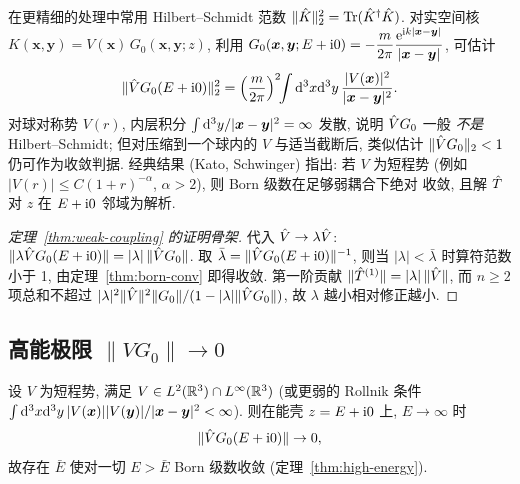 \begin{remark}
在更精细的处理中常用 Hilbert--Schmidt 范数
$\|\hat{K}\|_{2}^{2}=\operatorname{Tr}(\hat{K}^{\dagger}\hat{K})$. 对实空间核
$K(\bm x,\bm y)=V(\bm x)\,G_{0}(\bm x,\bm y;z)$, 利用
$G_{0}(\bm x,\bm y;E+\mathrm{i} 0)=-\dfrac{m}{2\pi}\dfrac{\mathrm{e}^{\mathrm{i} k|\bm x-\bm y|}}{|\bm x-\bm y|}$,
可估计
\begin{equation}
\|\hat{V} G_{0}(E+\mathrm{i} 0)\|_{2}^{2}
=\Bigl(\frac{m}{2\pi}\Bigr)^{2}\!\!\int\mathrm{d}^{3}x\mathrm{d}^{3}y\,
\frac{|V(\bm x)|^{2}}{|\bm x-\bm y|^{2}}.
\label{eq:born-HS}
\end{equation}
对球对称势 $V(r)$, 内层积分 $\int\mathrm{d}^{3}y/|\bm x-\bm y|^{2}=\infty$ 发散,
说明 $\hat{V} G_{0}$ 一般 \emph{不是} Hilbert--Schmidt; 但对压缩到一个球内的
$V$ 与适当截断后, 类似估计 $\|\hat{V} G_{0}\|_{2}<1$ 仍可作为收敛判据.
经典结果 (Kato, Schwinger) 指出: 若 $V$ 为短程势 (例如
$|V(r)|\le C(1+r)^{-\alpha}$, $\alpha>2$), 则 Born 级数在足够弱耦合下绝对
收敛, 且解 $\hat{T}$ 对 $z$ 在 $E+\mathrm{i} 0$ 邻域为解析.
\end{remark}

\begin{proof}[定理~\ref{thm:weak-coupling} 的证明骨架]
代入 $\hat{V}\to\lambda\hat{V}$:
$\|\lambda\hat{V} G_{0}(E+\mathrm{i} 0)\|=|\lambda|\,\|\hat{V} G_{0}\|$. 取
$\bar\lambda=\|\hat{V} G_{0}(E+\mathrm{i} 0)\|^{-1}$, 则当 $|\lambda|<\bar\lambda$
时算符范数小于 1, 由定理~\ref{thm:born-conv} 即得收敛. 第一阶贡献
$\|\hat{T}^{(1)}\|=|\lambda|\,\|\hat{V}\|$, 而 $n\ge 2$ 项总和不超过
$|\lambda|^{2}\|\hat{V}\|^{2}\|G_{0}\|/(1-|\lambda|\|\hat{V} G_{0}\|)$, 故
$\lambda$ 越小相对修正越小.
\end{proof}

\subsection{高能极限 $\|VG_{0}\|\to 0$}

\begin{theorem}[高能算符范数衰减]\label{thm:high-energy-detail}
设 $V$ 为短程势, 满足 $V\in L^{2}(\mathbb{R}^{3})\cap L^{\infty}(\mathbb{R}^{3})$ (或更弱的
Rollnik 条件 $\int\mathrm{d}^{3}x\mathrm{d}^{3}y\,|V(\bm x)||V(\bm y)|/|\bm x-\bm y|^{2}<\infty$).
则在能壳 $z=E+\mathrm{i} 0$ 上, $E\to\infty$ 时
\begin{equation}
\|\hat{V} G_{0}(E+\mathrm{i} 0)\|\to 0,
\label{eq:born-high-E}
\end{equation}
故存在 $\bar E$ 使对一切 $E>\bar E$ Born 级数收敛 (定理~\ref{thm:high-energy}).
\end{theorem}

